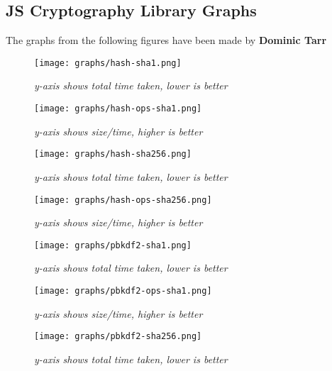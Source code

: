 
\subsection{JS Cryptography Library Graphs}
The graphs from the following figures have been made by \textbf{Dominic Tarr} \cite {Tarr2014PerformanceLibraries.}

\begin{figure}[htpb]
\centering
\caption{\small \sl y-axis shows total time taken, lower is better
\label{fig:hash-sha1}}  
\texttt{[image: graphs/hash-sha1.png]}
\end{figure}

\begin{figure}[htpb]
\centering
\caption{\small \sl y-axis shows size/time, higher is better
\label{fig:hash-ops-sha1}}
\texttt{[image: graphs/hash-ops-sha1.png]}
\end{figure}

\begin{figure}[htpb]
\centering
\caption{\small \sl y-axis shows total time taken, lower is better
\label{fig:hash-sha256}}
\texttt{[image: graphs/hash-sha256.png]}
\end{figure}

\begin{figure}[htpb]
\centering
\caption{\small \sl y-axis shows size/time, higher is better
\label{fig:hash-ops-sha256}}
\texttt{[image: graphs/hash-ops-sha256.png]}
\end{figure} 

\begin{figure}[htpb]
\centering
\caption{\small \sl y-axis shows total time taken, lower is better
\label{fig:pbkdf2-sha1}}
\texttt{[image: graphs/pbkdf2-sha1.png]}
\end{figure}

\begin{figure}[htpb]
\centering
\caption{\small \sl y-axis shows size/time, higher is better
\label{fig:pbkdf2-ops-sha1}}
\texttt{[image: graphs/pbkdf2-ops-sha1.png]}
\end{figure}

\begin{figure}[htpb]
\centering
\caption{\small \sl y-axis shows total time taken, lower is better
\label{fig:pbkdf2-sha256}}
\texttt{[image: graphs/pbkdf2-sha256.png]}
\end{figure}

